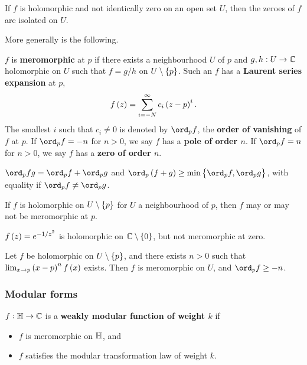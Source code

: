 \begin{corollary}
If $ f $ is holomorphic and not identically zero on an open set $ U $, then the zeroes of $ f $ are isolated on $ U $.
\end{corollary}

More generally is the following.

\begin{definition}
$ f $ is \textbf{meromorphic} at $ p $ if there exists a neighbourhood $ U $ of $ p $ and $ g, h : U \to \mathbb{C} $ holomorphic on $ U $ such that $ f = g / h $ on $ U \setminus \cbr{p} $. Such an $ f $ has a \textbf{Laurent series expansion} at $ p $,
$$ f\br{z} = \sum_{i = -N}^\infty c_i\br{z - p}^i. $$
The smallest $ i $ such that $ c_i \ne 0 $ is denoted by $ \ord_p f $, the \textbf{order of vanishing} of $ f $ at $ p $. If $ \ord_p f = -n $ for $ n > 0 $, we say $ f $ has a \textbf{pole of order $ n $}. If $ \ord_p f = n $ for $ n > 0 $, we say $ f $ has a \textbf{zero of order $ n $}.
\end{definition}

\begin{proposition}
$ \ord_p fg = \ord_p f + \ord_p g $ and $ \ord_p \br{f + g} \ge \min\cbr{\ord_p f, \ord_p g} $, with equality if $ \ord_p f \ne \ord_p g $.
\end{proposition}

If $ f $ is holomorphic on $ U \setminus \cbr{p} $ for $ U $ a neighbourhood of $ p $, then $ f $ may or may not be meromorphic at $ p $.

\begin{example*}
$ f\br{z} = e^{-1 / z^2} $ is holomorphic on $ \CC \setminus \cbr{0} $, but not meromorphic at zero.
\end{example*}

\begin{theorem}
Let $ f $ be holomorphic on $ U \setminus \cbr{p} $, and there exists $ n > 0 $ such that $ \lim_{x \to p} \br{x - p}^nf\br{x} $ exists. Then $ f $ is meromorphic on $ U $, and $ \ord_p f \ge -n $.
\end{theorem}

\subsubsection{Modular forms}

\begin{definition}
$ f : \mathbb{H} \to \mathbb{C} $ is a \textbf{weakly modular function of weight $ k $} if
\begin{itemize}
\item $ f $ is meromorphic on $ \mathbb{H} $, and
\item $ f $ satisfies the modular transformation law of weight $ k $.
\end{itemize}
\end{definition}

